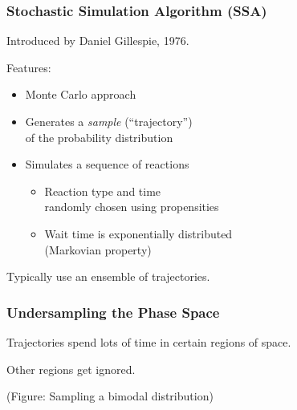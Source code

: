 \documentclass[xcolor={usenames,dvipsnames,svgnames}]{beamer}
\begin{document}
\begin{frame}
    \frametitle{Stochastic Simulation Algorithm (SSA)}
    Introduced by Daniel Gillespie, 1976.

    Features:
    \begin{itemize}
        \item Monte Carlo approach
        \item Generates a \emph{sample} (``trajectory'')\\
            of the probability distribution
        \item Simulates a sequence of reactions
        \begin{itemize}
            \item Reaction type and time\\
                randomly chosen using propensities
            \item Wait time is exponentially distributed\\
                (Markovian property)
        \end{itemize}
    \end{itemize}
    Typically use an ensemble of trajectories.
\end{frame}

\begin{frame}
    \frametitle{Undersampling the Phase Space}
    Trajectories spend lots of time in certain regions of space.

    Other regions get ignored.

    (Figure: Sampling a bimodal distribution)
\end{frame}
\end{document}
